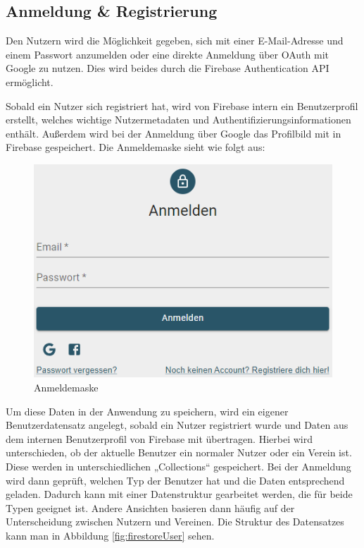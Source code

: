 \subsection{Anmeldung \& Registrierung}
\label{sec:login}

Den Nutzern wird die Möglichkeit gegeben, sich mit einer E-Mail-Adresse und einem Passwort anzumelden oder eine direkte Anmeldung über OAuth mit Google zu nutzen.
Dies wird beides durch die Firebase Authentication API ermöglicht.

Sobald ein Nutzer sich registriert hat, wird von Firebase intern ein Benutzerprofil erstellt, welches wichtige Nutzermetadaten und Authentifizierungsinformationen enthält.
Außerdem wird bei der Anmeldung über Google das Profilbild mit in Firebase gespeichert.
Die Anmeldemaske sieht wie folgt aus:

\begin{figure}[ht!]
  \begin{centering}
    \includegraphics[width=.75\textwidth]{figures/implementation/anmeldemaske.png}
    \caption{Anmeldemaske}
    \label{fig:login}
  \end{centering}
\end{figure}

Um diese Daten in der Anwendung zu speichern, wird ein eigener Benutzerdatensatz angelegt, sobald ein Nutzer registriert wurde und Daten aus dem internen Benutzerprofil von Firebase mit übertragen.
Hierbei wird unterschieden, ob der aktuelle Benutzer ein normaler Nutzer oder ein Verein ist.
Diese werden in unterschiedlichen „Collections“ gespeichert.
Bei der Anmeldung wird dann geprüft, welchen Typ der Benutzer hat und die Daten entsprechend geladen.
Dadurch kann mit einer Datenstruktur gearbeitet werden, die für beide Typen geeignet ist.
Andere Ansichten basieren dann häufig auf der Unterscheidung zwischen Nutzern und Vereinen.
Die Struktur des Datensatzes kann man in Abbildung \ref{fig:firestoreUser} sehen.

